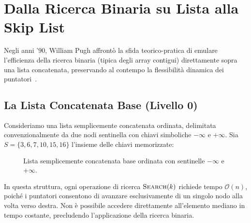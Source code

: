 \FloatBarrier
\section{Dalla Ricerca Binaria su Lista alla Skip List}
\label{sec:binary-search-to-skip-list}

Negli anni '90, William Pugh affrontò la sfida teorico-pratica di emulare l'efficienza della ricerca binaria (tipica degli array contigui) direttamente sopra una lista concatenata, preservando al contempo la flessibilità dinamica dei puntatori~\cite{pugh1990}.

\FloatBarrier
\subsection{La Lista Concatenata Base (Livello 0)}
Consideriamo una lista semplicemente concatenata ordinata, delimitata convenzionalmente da due nodi sentinella con chiavi simboliche $-\infty$ e $+\infty$. Sia $S = \{3, 6, 7, 10, 15, 16\}$ l'insieme delle chiavi memorizzate:

\begin{figure}[H]
\centering
{}
\caption{Lista semplicemente concatenata base ordinata con sentinelle $-\infty$ e $+\infty$.}
\label{fig:base-linked-list}
\end{figure}

In questa struttura, ogni operazione di ricerca $\textsc{Search}(k)$ richiede tempo $\mathcal{O}(n)$, poiché i puntatori consentono di avanzare esclusivamente di un singolo nodo alla volta verso destra. Non è possibile accedere direttamente all'elemento mediano in tempo costante, precludendo l'applicazione della ricerca binaria.

